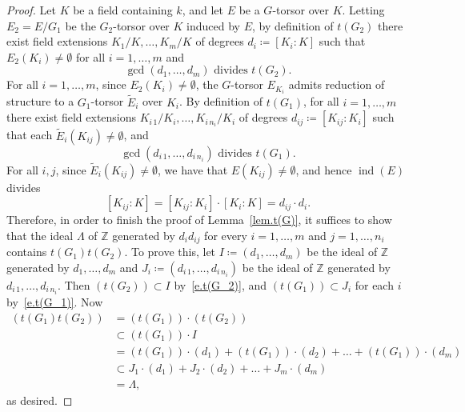 \documentclass[10pt,a4paper]{amsart}
\newcommand{\ind}{\operatorname{ind}}
\begin{document}
\begin{proof} Let $K$ be a field containing $k$, and let $E$ be a $G$-torsor over $K$.  
Letting $E_2=E/G_1$ be the $G_2$-torsor over $K$ induced by $E$, by definition of $t(G_2)$ there exist field extensions $K_1/K, \ldots, K_m/K$ of degrees $d_i\coloneqq [K_i : K]$ such that $E_2(K_i)\neq\emptyset$ for all $i=1,\dots,m$ and 
\begin{equation} \label{e.t(G_2)}
\text{$\gcd(d_1, \ldots, d_m)$ divides $t(G_2)$.}
\end{equation}
For all $i=1,\dots,m$, since $E_2(K_i)\neq\emptyset$, the $G$-torsor $E_{K_i}$ admits reduction of structure to a $G_1$-torsor $\tilde{E}_i$ over $K_i$. By definition of $t(G_1)$, for all $i = 1, \ldots, m$ there exist field extensions $K_{i\, 1}/K_i, \ldots, K_{i\,n_i}/K_i$ of degrees $d_{ij} \coloneqq [K_{ij}: K_i]$ such that each $\tilde{E}_i(K_{ij})\neq\emptyset$, and
\begin{equation} \label{e.t(G_1)}
\text{$\gcd(d_{i\, 1}, \ldots, d_{i\, n_i})$ divides $t(G_1)$.}
\end{equation} 
For all $i,j$, since $\tilde{E}_i(K_{ij})\neq\emptyset$, we have that $E(K_{ij})\neq\emptyset$, and hence $\ind(E)$ divides  
\[ [K_{ij}: K] = [K_{ij}: K_i] \cdot [K_i: K] = d_{ij} \cdot d_i.\]
Therefore, in order to finish the proof of Lemma~\ref{lem.t(G)}, it suffices to show that the ideal $\Lambda$ of $\mathbb Z$ generated by $d_i d_{ij}$ for every $i = 1, \ldots, m$ and $j = 1, \ldots, n_i$ contains $t(G_1) t(G_2)$. To prove this, let $I \coloneqq (d_1, \ldots, d_m) $ be the ideal of $\mathbb Z$ generated by $d_1, \ldots, d_m$ and $J_i \coloneqq (d_{i\, 1}, \ldots, d_{i\, n_i})$ be the ideal of $\mathbb Z$ generated by $d_{i\, 1}, \ldots, d_{i\, n_i}$. Then $(t(G_2)) \subset I$ by~\eqref{e.t(G_2)}, and $(t(G_1)) \subset J_i$ for each $i$  by~\eqref{e.t(G_1)}. Now
\begin{align*}
(t(G_1)t(G_2))
&= (t(G_1)) \cdot (t(G_2)) \\
&\subset (t(G_1)) \cdot I \\
&= (t(G_1)) \cdot (d_1) + (t(G_1)) \cdot (d_2) + \ldots
   + (t(G_1)) \cdot (d_m) \\
&\subset J_1 \cdot (d_1) + J_2 \cdot (d_2) + \ldots + J_m \cdot (d_m) \\
&= \Lambda,
\end{align*}
as desired.     
\end{proof}
\end{document}
